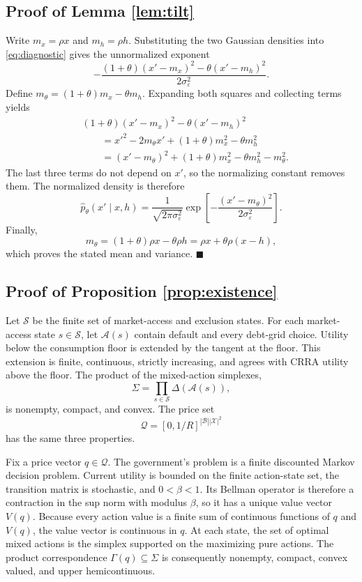 \documentclass[11pt]{article}
\theoremstyle{definition}
\begin{document}
\subsection{Proof of Lemma \ref{lem:tilt}}
Write $m_x=\rho x$ and $m_h=\rho h$. Substituting the two Gaussian densities into \eqref{eq:diagnostic} gives the unnormalized exponent
\[
 -\frac{(1+\theta)(x'-m_x)^2-\theta(x'-m_h)^2}{2\sigma_\varepsilon^2}.
\]
Define $m_\theta=(1+\theta)m_x-\theta m_h$. Expanding both squares and collecting terms yields
\[
\begin{aligned}
&(1+\theta)(x'-m_x)^2-\theta(x'-m_h)^2\\
&\qquad=x'^2-2m_\theta x'+(1+\theta)m_x^2-\theta m_h^2\\
&\qquad=(x'-m_\theta)^2+(1+\theta)m_x^2-\theta m_h^2-m_\theta^2.
\end{aligned}
\]
The last three terms do not depend on $x'$, so the normalizing constant removes them. The normalized density is therefore
\[
\hat p_\theta(x'\mid x,h)
=\frac{1}{\sqrt{2\pi\sigma_\varepsilon^2}}
\exp\!\left[-\frac{(x'-m_\theta)^2}{2\sigma_\varepsilon^2}\right].
\]
Finally,
\[
m_\theta=(1+\theta)\rho x-\theta\rho h
=\rho x+\theta\rho(x-h),
\]
which proves the stated mean and variance. $\blacksquare$

\subsection{Proof of Proposition \ref{prop:existence}}
Let $\mathcal S$ be the finite set of market-access and exclusion states. For each market-access state $s\in\mathcal S$, let $\mathcal A(s)$ contain default and every debt-grid choice. Utility below the consumption floor is extended by the tangent at the floor. This extension is finite, continuous, strictly increasing, and agrees with CRRA utility above the floor. The product of the mixed-action simplexes,
\[
\Sigma=\prod_{s\in\mathcal S}\Delta(\mathcal A(s)),
\]
is nonempty, compact, and convex. The price set
\[
\mathcal Q=[0,1/R]^{|\mathcal B||\mathcal X|^2}
\]
has the same three properties.

Fix a price vector $q\in\mathcal Q$. The government's problem is a finite discounted Markov decision problem. Current utility is bounded on the finite action-state set, the transition matrix is stochastic, and $0<\beta<1$. Its Bellman operator is therefore a contraction in the sup norm with modulus $\beta$, so it has a unique value vector $V(q)$. Because every action value is a finite sum of continuous functions of $q$ and $V(q)$, the value vector is continuous in $q$. At each state, the set of optimal mixed actions is the simplex supported on the maximizing pure actions. The product correspondence $\Gamma(q)\subseteq\Sigma$ is consequently nonempty, compact, convex valued, and upper hemicontinuous.
\end{document}
